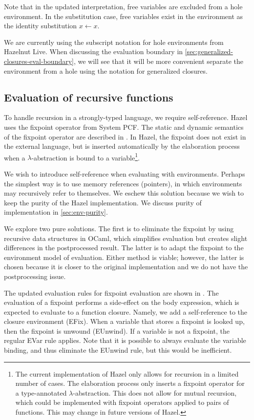 Note that in the updated interpretation, free variables are excluded from a hole environment. In the substitution case, free variables exist in the environment as the identity substitution $x\leftarrow x$.

We are currently using the subscript notation for hole environments from Hazelnut Live. When discussing the evaluation boundary in \cref{sec:generalized-closures-eval-boundary}, we will see that it will be more convenient separate the environment from a hole using the notation for generalized closures.

\subsection{Evaluation of recursive functions}
\label{sec:rec_impl}

To handle recursion in a strongly-typed language, we require self-reference. Hazel uses the fixpoint operator from System PCF. The static and dynamic semantics of the fixpoint operator are described in . In Hazel, the fixpoint does not exist in the external language, but is inserted automatically by the elaboration process when a $\lambda$-abstraction is bound to a variable\footnote{The current implementation of Hazel only allows for recursion in a limited number of cases. The elaboration process only inserts a fixpoint operator for a type-annotated $\lambda$-abstraction. This does not allow for mutual recursion, which could be implemented with fixpoint operators applied to pairs of functions. This may change in future versions of Hazel.}.

We wish to introduce self-reference when evaluating with environments. Perhaps the simplest way is to use memory references (pointers), in which environments may recursively refer to themselves. We eschew this solution because we wish to keep the purity of the Hazel implementation. We discuss purity of implementation in \cref{sec:env-purity}.

We explore two pure solutions. The first is to eliminate the fixpoint by using recursive data structures in OCaml, which simplifies evaluation but creates slight differences in the postprocessed result. The latter is to adapt the fixpoint to the environment model of evaluation. Either method is viable; however, the latter is chosen because it is closer to the original implementation and we do not have the postprocessing issue.

The updated evaluation rules for fixpoint evaluation are shown in . The evaluation of a fixpoint performs a side-effect on the body expression, which is expected to evaluate to a function closure. Namely, we add a self-reference to the closure environment (EFix). When a variable that stores a fixpoint is looked up, then the fixpoint is unwound (EUnwind). If a variable is not a fixpoint, the regular EVar rule applies. Note that it is possible to always evaluate the variable binding, and thus eliminate the EUnwind rule, but this would be inefficient.

